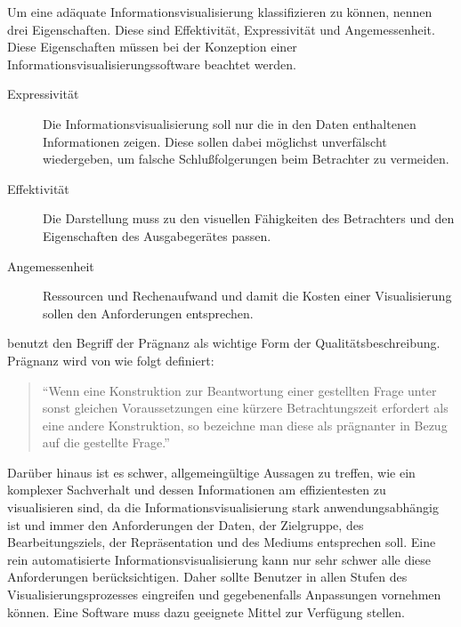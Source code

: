 \documentclass[a4paper, 12pt, DIV=calc, version=first, pdftex, headsepline, footsepline, bibtotocnumbered, liststotocnumbered]{scrreprt}
\begin{document}
Um eine adäquate Informationsvisualisierung klassifizieren zu können, nennen \citep{Schumann} drei Eigenschaften.
Diese sind Effektivität, Expressivität und Angemessenheit. Diese Eigenschaften müssen bei der Konzeption einer
Informationsvisualisierungssoftware beachtet werden.
\begin{description}
\item[Expressivität]
Die Informationsvisualisierung soll nur die in den Daten enthaltenen Informationen zeigen.
Diese sollen dabei möglichst unverfälscht wiedergeben, um falsche Schlußfolgerungen beim Betrachter zu vermeiden.
\item[Effektivität]
Die Darstellung muss zu den visuellen Fähigkeiten des Betrachters und den Eigenschaften des Ausgabegerätes
passen.
\item[Angemessenheit]
Ressourcen und Rechenaufwand und damit die Kosten einer Visualisierung sollen den Anforderungen entsprechen.
\end{description}
\citep{Bertin} benutzt den Begriff der Prägnanz als wichtige Form der Qualitätsbeschreibung.
Prägnanz wird von \citep[S.\,17]{Bertin} wie folgt definiert:
\begin{quote}
"`Wenn eine Konstruktion zur Beantwortung einer gestellten Frage unter sonst gleichen Voraussetzungen eine
kürzere Betrachtungszeit erfordert als eine andere Konstruktion, so bezeichne man diese als prägnanter in
Bezug auf die gestellte Frage."'
\end{quote}
Darüber hinaus ist es schwer, allgemeingültige Aussagen zu treffen, wie ein komplexer Sachverhalt und dessen
Informationen am effizientesten zu visualisieren sind, da die Informationsvisualisierung stark anwendungsabhängig ist und
immer den Anforderungen der Daten, der Zielgruppe, des Bearbeitungsziels, der Repräsentation und des Mediums entsprechen soll.
Eine rein automatisierte Informationsvisualisierung kann nur sehr schwer alle diese Anforderungen berücksichtigen. Daher
sollte Benutzer in allen Stufen des Visualisierungsprozesses eingreifen und gegebenenfalls Anpassungen vornehmen können. Eine Software
muss dazu geeignete Mittel zur Verfügung stellen.
\end{document}
